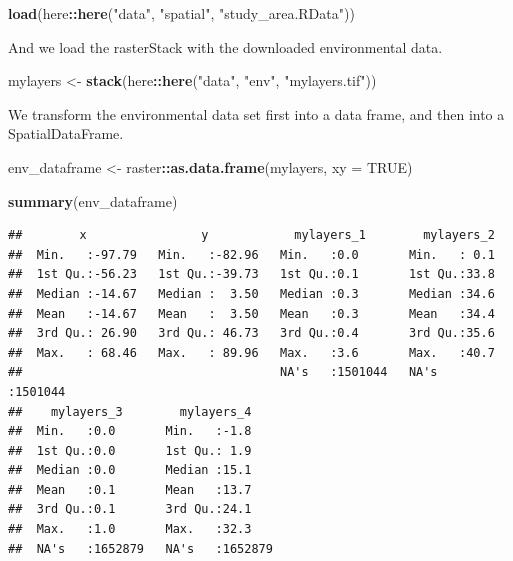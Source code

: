 \documentclass[
]{book}
\newenvironment{Shaded}{\begin{snugshade}}{\end{snugshade}}
\newcommand{\AttributeTok}[1]{\textcolor[rgb]{0.13,0.29,0.53}{#1}}
\newcommand{\ConstantTok}[1]{\textcolor[rgb]{0.56,0.35,0.01}{#1}}
\newcommand{\FunctionTok}[1]{\textcolor[rgb]{0.13,0.29,0.53}{\textbf{#1}}}
\newcommand{\NormalTok}[1]{#1}
\newcommand{\OtherTok}[1]{\textcolor[rgb]{0.56,0.35,0.01}{#1}}
\newcommand{\SpecialCharTok}[1]{\textcolor[rgb]{0.81,0.36,0.00}{\textbf{#1}}}
\newcommand{\StringTok}[1]{\textcolor[rgb]{0.31,0.60,0.02}{#1}}
\begin{document}
\begin{Shaded}
\begin{Highlighting}[]
\FunctionTok{load}\NormalTok{(here}\SpecialCharTok{::}\FunctionTok{here}\NormalTok{(}\StringTok{"data"}\NormalTok{, }\StringTok{"spatial"}\NormalTok{, }\StringTok{"study\_area.RData"}\NormalTok{))}
\end{Highlighting}
\end{Shaded}

And we load the rasterStack with the downloaded environmental data.

\begin{Shaded}
\begin{Highlighting}[]
\NormalTok{mylayers }\OtherTok{\textless{}{-}} \FunctionTok{stack}\NormalTok{(here}\SpecialCharTok{::}\FunctionTok{here}\NormalTok{(}\StringTok{"data"}\NormalTok{, }\StringTok{"env"}\NormalTok{,}
    \StringTok{"mylayers.tif"}\NormalTok{))}
\end{Highlighting}
\end{Shaded}

We transform the environmental data set first into a data frame, and then into a SpatialDataFrame.

\begin{Shaded}
\begin{Highlighting}[]
\NormalTok{env\_dataframe }\OtherTok{\textless{}{-}}\NormalTok{ raster}\SpecialCharTok{::}\FunctionTok{as.data.frame}\NormalTok{(mylayers,}
    \AttributeTok{xy =} \ConstantTok{TRUE}\NormalTok{)}

\FunctionTok{summary}\NormalTok{(env\_dataframe)}
\end{Highlighting}
\end{Shaded}

\begin{verbatim}
##        x                y            mylayers_1        mylayers_2     
##  Min.   :-97.79   Min.   :-82.96   Min.   :0.0       Min.   : 0.1     
##  1st Qu.:-56.23   1st Qu.:-39.73   1st Qu.:0.1       1st Qu.:33.8     
##  Median :-14.67   Median :  3.50   Median :0.3       Median :34.6     
##  Mean   :-14.67   Mean   :  3.50   Mean   :0.3       Mean   :34.4     
##  3rd Qu.: 26.90   3rd Qu.: 46.73   3rd Qu.:0.4       3rd Qu.:35.6     
##  Max.   : 68.46   Max.   : 89.96   Max.   :3.6       Max.   :40.7     
##                                    NA's   :1501044   NA's   :1501044  
##    mylayers_3        mylayers_4     
##  Min.   :0.0       Min.   :-1.8     
##  1st Qu.:0.0       1st Qu.: 1.9     
##  Median :0.0       Median :15.1     
##  Mean   :0.1       Mean   :13.7     
##  3rd Qu.:0.1       3rd Qu.:24.1     
##  Max.   :1.0       Max.   :32.3     
##  NA's   :1652879   NA's   :1652879
\end{verbatim}
\end{document}
